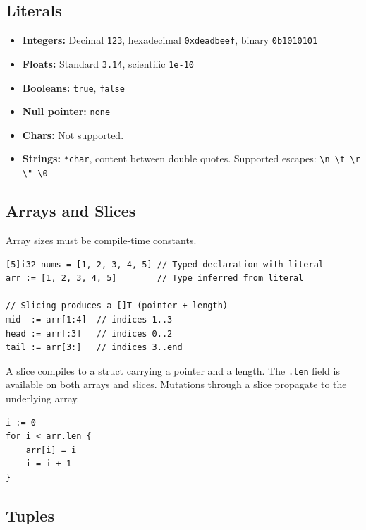 \subsection{Literals}

\begin{itemize}
    \item \textbf{Integers:} Decimal \texttt{123}, hexadecimal \texttt{0xdeadbeef},
          binary \texttt{0b1010101}
    \item \textbf{Floats:} Standard \texttt{3.14}, scientific \texttt{1e-10}
    \item \textbf{Booleans:} \texttt{true}, \texttt{false}
    \item \textbf{Null pointer:} \texttt{none}
    \item \textbf{Chars:} Not supported.
    \item \textbf{Strings:} \texttt{*char}, content between double quotes.
          Supported escapes: \texttt{{\textbackslash}n \textbackslash t \textbackslash r \textbackslash" \textbackslash 0}
\end{itemize}

\subsection{Arrays and Slices}

Array sizes must be compile-time constants.
\begin{lstlisting}[style=zinc, caption={Arrays and slices}]
[5]i32 nums = [1, 2, 3, 4, 5] // Typed declaration with literal
arr := [1, 2, 3, 4, 5]        // Type inferred from literal

// Slicing produces a []T (pointer + length)
mid  := arr[1:4]  // indices 1..3
head := arr[:3]   // indices 0..2
tail := arr[3:]   // indices 3..end
\end{lstlisting}

A slice compiles to a struct carrying a pointer and a length.
The \texttt{.len} field is available on both arrays and slices.
Mutations through a slice propagate to the underlying array.

\begin{lstlisting}[style=zinc, caption={Iterating with .len}]
i := 0
for i < arr.len {
    arr[i] = i
    i = i + 1
}
\end{lstlisting}

\subsection{Tuples}

